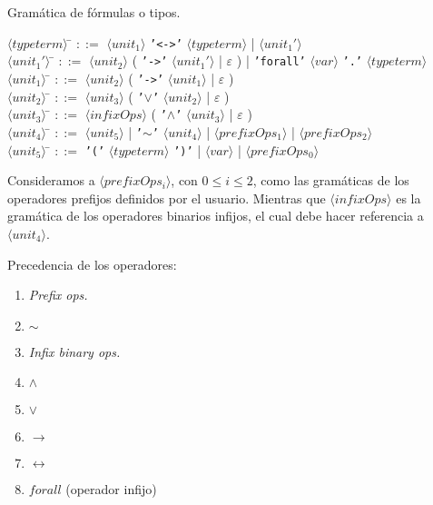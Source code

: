 \documentclass[a4paper,11pt]{article}
\theoremstyle{definition}
\begin{document}
Gramática de fórmulas o tipos.

\begin{tabbing}
$\langle typeterm \rangle$ \= $::=$ $\langle unit_{1} \rangle$ \texttt{'<->'} $\langle typeterm \rangle$ | $\langle unit_{1}' \rangle$\\
$\langle unit_{1}' \rangle$ \= $::=$ $\langle unit_{2} \rangle$ ( \texttt{'->'} $\langle unit_{1}' \rangle$ | $\varepsilon$ ) 
| \texttt{'forall'} $\langle var \rangle$ \texttt{'.'} $\langle typeterm \rangle$\\
$\langle unit_{1} \rangle$ \= $::=$ $\langle unit_{2} \rangle$ ( \texttt{'->'} $\langle unit_{1} \rangle$ | $\varepsilon$ ) \\
$\langle unit_{2} \rangle$ \= $::=$ $\langle unit_{3} \rangle$ ( \texttt{'$\vee$'} $\langle unit_{2} \rangle$ | $\varepsilon$ ) \\
$\langle unit_{3} \rangle$ \= $::=$ $\langle infixOps \rangle$ ( \texttt{'$\wedge$'} $\langle unit_{3} \rangle$ | $\varepsilon$ ) \\
$\langle unit_{4} \rangle$ \= $::=$ $\langle unit_{5} \rangle$ | \texttt{'$\sim$'} $\langle unit_{4} \rangle$ |
$\langle prefixOps_{1} \rangle$ | $\langle prefixOps_{2} \rangle$ \\
$\langle unit_{5} \rangle$ \= $::=$ \texttt{'('} $\langle typeterm \rangle$ \texttt{')'} | $\langle var \rangle$ | 
$\langle prefixOps_{0} \rangle$

\end{tabbing}

Consideramos a $\langle prefixOps_{i} \rangle$, con $0 \leq i \leq 2$, como las gramáticas de los operadores prefijos definidos por el usuario.
Mientras que $\langle infixOps \rangle$ es la gramática de los operadores binarios infijos, el cual debe hacer referencia a $\langle unit_{4} \rangle$.

Precedencia de los operadores:
\begin{enumerate}
  \item \textit{Prefix ops.}
  \item $\sim$
  \item \textit{Infix binary ops.}
  \item $\wedge$
  \item $\vee$
  \item $\rightarrow$
  \item $\leftrightarrow$
  \item $forall$ (operador infijo)
\end{enumerate}
\end{document}
